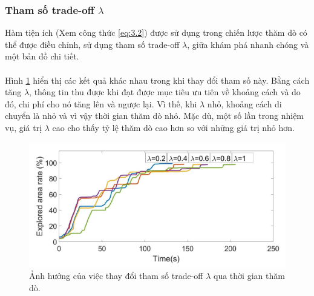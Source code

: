 \documentclass[11pt,openany]{book}
\begin{document}
\subsubsection{Tham số trade-off $\lambda$}
Hàm tiện ích (Xem công thức \ref{eq:3.2}) được sử dụng trong chiến lược thăm dò có thể được điều chỉnh, sử dụng tham số trade-off $\lambda$, giữa khám phá nhanh chóng và một bản đồ chi tiết.\\\\
Hình \ref{fig:3.11} hiển thị các kết quả khác nhau trong khi thay đổi tham số này. Bằng cách tăng $\lambda$, thông tin thu được khi đạt được mục tiêu ưu tiên về khoảng cách và do đó, chi phí cho nó tăng lên và ngược lại. Vì thế, khi $\lambda$ nhỏ, khoảng cách di chuyển là nhỏ và vì vậy thời gian thăm dò nhỏ. Mặc dù, một số lần trong nhiệm vụ, giá trị $\lambda$ cao cho thấy tỷ lệ thăm dò cao hơn so với những giá trị nhỏ hơn.
\begin{figure}[H]
    \centering
    \includegraphics[scale=0.5]{assets/3_11.png}
    \caption{Ảnh hưởng của việc thay đổi tham số trade-off $\lambda$ qua thời gian thăm dò.}
    \label{fig:3.11}
\end{figure}
\end{document}
